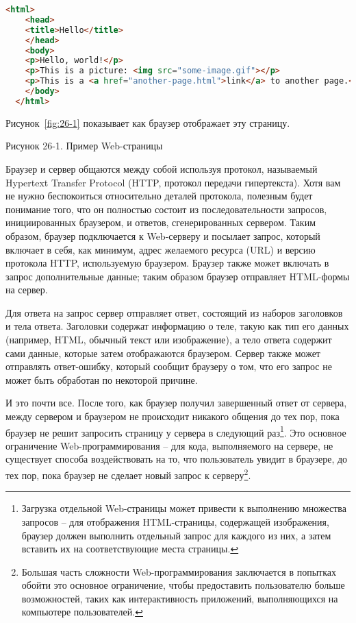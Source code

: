 \begin{lstlisting}[language=HTML]
  <html>
    <head>
    <title>Hello</title>
    </head>
    <body>
    <p>Hello, world!</p>
    <p>This is a picture: <img src="some-image.gif"></p>
    <p>This is a <a href="another-page.html">link</a> to another page.</p>
    </body>
  </html>
\end{lstlisting}

Рисунок~\ref{fig:26-1} показывает как браузер отображает эту страницу.

Рисунок 26-1. Пример Web-страницы

Браузер и сервер общаются между собой используя протокол, называемый Hypertext Transfer
Protocol (HTTP, протокол передачи гипертекста). Хотя вам не нужно беспокоиться
относительно деталей протокола, полезным будет понимание того, что он полностью состоит из
последовательности запросов, инициированных браузером, и ответов, сгенерированных
сервером. Таким образом, браузер подключается к Web-серверу и посылает запрос, который
включает в себя, как минимум, адрес желаемого ресурса (URL) и версию протокола HTTP,
используемую браузером. Браузер также может включать в запрос дополнительные данные; таким
образом браузер отправляет HTML-формы на сервер.

Для ответа на запрос сервер отправляет ответ, состоящий из наборов заголовков и тела
ответа. Заголовки содержат информацию о теле, такую как тип его данных (например, HTML,
обычный текст или изображение), а тело ответа содержит сами данные, которые затем
отображаются браузером. Сервер также может отправлять ответ-ошибку, который сообщит
браузеру о том, что его запрос не может быть обработан по некоторой причине.

И это почти все. После того, как браузер получил завершенный ответ от сервера, между
сервером и браузером не происходит никакого общения до тех пор, пока браузер не решит
запросить страницу у сервера в следующий раз\footnote{Загрузка отдельной Web-страницы
  может привести к выполнению множества запросов -- для отображения HTML-страницы,
  содержащей изображения, браузер должен выполнить отдельный запрос для каждого из них, а
  затем вставить их на соответствующие места страницы.}. Это основное ограничение
Web-программирования -- для кода, выполняемого на сервере, не существует способа
воздействовать на то, что пользователь увидит в браузере, до тех пор, пока браузер не
сделает новый запрос к серверу\footnote{Большая часть сложности Web-программирования
  заключается в попытках обойти это основное ограничение, чтобы предоставить пользователю
  больше возможностей, таких как интерактивность приложений, выполняющихся на компьютере
  пользователей.}.

